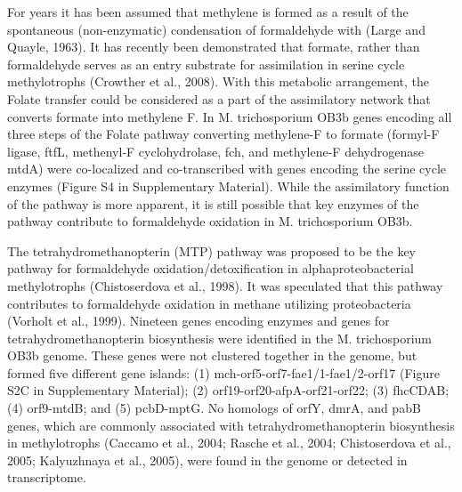 For years it has been assumed that methylene  is formed as a result of the spontaneous (non-enzymatic) condensation of formaldehyde with  (Large and Quayle, 1963).
It has recently been demonstrated that formate, rather than formaldehyde serves as an entry substrate for assimilation in serine cycle methylotrophs (Crowther et al., 2008).
With this metabolic arrangement, the Folate  transfer could be considered as a part of the assimilatory network that converts formate into methylene F.
In M. trichosporium OB3b genes encoding all three steps of the Folate pathway converting methylene-F to formate (formyl-F ligase, ftfL, methenyl-F cyclohydrolase, fch, and methylene-F dehydrogenase mtdA) were co-localized and co-transcribed with genes encoding the serine cycle enzymes (Figure S4 in Supplementary Material).
While the assimilatory function of the pathway is more apparent, it is still possible that key enzymes of the pathway contribute to formaldehyde oxidation in M. trichosporium OB3b.

The tetrahydromethanopterin (MTP) pathway was proposed to be the key pathway for formaldehyde oxidation/detoxification in alphaproteobacterial methylotrophs (Chistoserdova et al., 1998).
It was speculated that this pathway contributes to formaldehyde oxidation in methane utilizing proteobacteria (Vorholt et al., 1999).
Nineteen genes encoding enzymes and genes for tetrahydromethanopterin biosynthesis were identified in the M. trichosporium OB3b genome.
These genes were not clustered together in the genome, but formed five different gene islands: (1) mch-orf5-orf7-fae1/1-fae1/2-orf17 (Figure S2C in Supplementary Material); (2) orf19-orf20-afpA-orf21-orf22; (3) fhcCDAB; (4) orf9-mtdB; and (5) pcbD-mptG.
No homologs of orfY, dmrA, and pabB genes, which are commonly associated with tetrahydromethanopterin biosynthesis in methylotrophs (Caccamo et al., 2004; Rasche et al., 2004; Chistoserdova et al., 2005; Kalyuzhnaya et al., 2005), were found in the genome or detected in transcriptome.


